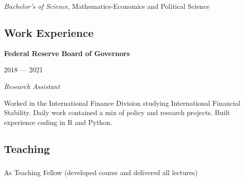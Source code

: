 \documentclass[
  letterpaper,
  DIV=11,
  numbers=noendperiod]{scrartcl}
\makeatletter
\let\oldsubparagraph\subparagraph
\renewcommand{\subparagraph}{
    \@ifstar
      \xxxSubParagraphStar
      \xxxSubParagraphNoStar
  }
\newcommand{\xxxSubParagraphStar}[1]{\oldsubparagraph*{#1}\mbox{}}
\newcommand{\xxxSubParagraphNoStar}[1]{\oldsubparagraph{#1}\mbox{}}
\makeatother
\begin{document}
\vspace{-6pt}\begin{minipage}{\linewidth}

\emph{Bachelor's of Science}, Mathematics-Economics and Political
Science

\end{minipage}

\subsection{Work
Experience}\vspace{-20pt}\noindent\makebox[\linewidth]{\rule{\textwidth}{0.5pt}}

\begin{minipage}{0.7\linewidth}

\textbf{Federal Reserve Board of Governors}

\end{minipage}\begin{minipage}{0.3\linewidth}\begin{flushright}

2018 --- 2021

\end{flushright}\end{minipage}

\vspace{-6pt}\begin{minipage}{\linewidth}

\emph{Research Assistant}

\end{minipage}

\vspace{-1pt}\begin{minipage}{\linewidth}

Worked in the International Finance Division studying International
Financial Stability. Daily work contained a mix of policy and research
projects. Built experience coding in R and Python.

\end{minipage}

\subsection{Teaching}\vspace{-20pt}\noindent\makebox[\linewidth]{\rule{\textwidth}{0.5pt}}

\subparagraph{As Teaching Fellow (developed course and delivered all
lectures)}\label{as-teaching-fellow-developed-course-and-delivered-all-lectures}
\end{document}
